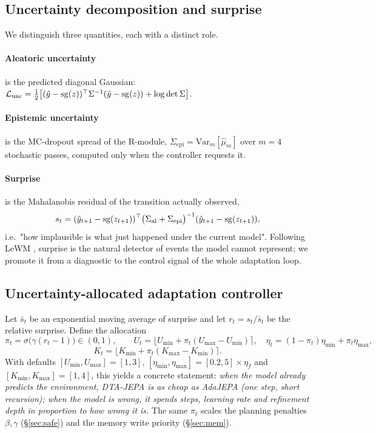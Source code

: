 \subsection{Uncertainty decomposition and surprise}\label{sec:unc}

We distinguish three quantities, each with a distinct role.

\paragraph{Aleatoric uncertainty} is the predicted diagonal Gaussian:
$\mathcal L_{\mathrm{unc}} = \tfrac12\big[(\hat{y}-\mathrm{sg}(z))^\top\Sigma^{-1}(\hat{y}-\mathrm{sg}(z)) +
\log\det\Sigma\big]$.

\paragraph{Epistemic uncertainty} is the MC-dropout spread of the R-module,
$\Sigma_{\mathrm{epi}} = \mathrm{Var}_m[\hat\mu_m]$ over $m=4$ stochastic passes, computed only
when the controller requests it.

\paragraph{Surprise} is the Mahalanobis residual of the transition actually observed,
\begin{equation}
s_t = (\hat{y}_{t+1}-\mathrm{sg}(z_{t+1}))^{\top}\big(\Sigma_{\mathrm{al}}+\Sigma_{\mathrm{epi}}\big)^{-1}
(\hat{y}_{t+1}-\mathrm{sg}(z_{t+1})),
\label{eq:surprise}
\end{equation}
i.e.\ "how implausible is what just happened under the current model". Following LeWM
\cite{maes-2026-lewm}, surprise is the natural detector of events the model cannot represent;
we promote it from a diagnostic to the control signal of the whole adaptation loop.

\subsection{Uncertainty-allocated adaptation controller}\label{sec:ctrl}

Let $\bar s_t$ be an exponential moving average of surprise and let
$r_t = s_t/\bar s_t$ be the relative surprise. Define the allocation
\begin{equation}
\pi_t = \sigma\big(\gamma (r_t-1)\big)\in(0,1),\qquad
U_t = \lfloor U_{\min}+\pi_t(U_{\max}-U_{\min})\rceil,\quad
\eta_t = (1-\pi_t)\eta_{\min}+\pi_t \eta_{\max},
\end{equation}
\begin{equation}
K_t = \lfloor K_{\min}+\pi_t(K_{\max}-K_{\min})\rceil .
\end{equation}
With defaults $[U_{\min},U_{\max}]=[1,3]$, $[\eta_{\min},\eta_{\max}]=[0.2,5]\times\eta_f$ and
$[K_{\min},K_{\max}]=[1,4]$, this yields a concrete statement: \emph{when the model already
predicts the environment, DTA-JEPA is as cheap as AdaJEPA (one step, short recursion); when
the model is wrong, it spends steps, learning rate and refinement depth in proportion to how
wrong it is.} The same $\pi_t$ scales the planning penalties $\beta,\gamma$
(\S\ref{sec:safe}) and the memory write priority (\S\ref{sec:mem}).

